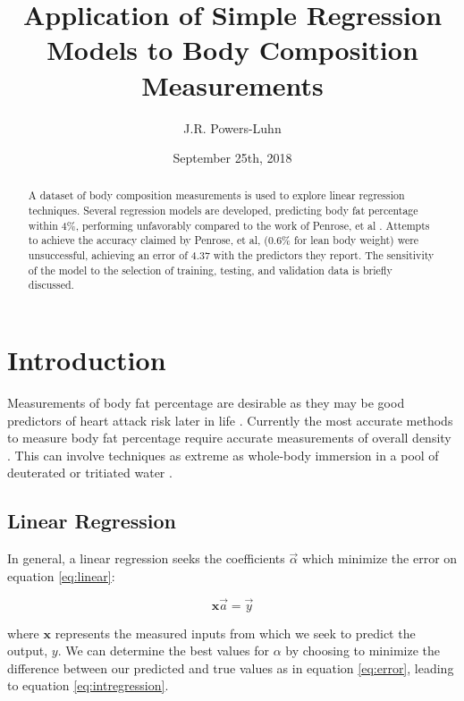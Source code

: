 \documentclass{IEEEtran}
\author{J.R. Powers-Luhn}
\title{Application of Simple Regression Models to Body Composition Measurements}
\date{September 25th, 2018}
\begin{document}
\maketitle

\begin{abstract}

A dataset of body composition measurements is used to explore linear regression techniques. Several regression models are developed, predicting body fat percentage within 4\%, performing unfavorably compared to the work of Penrose, et al \cite{Penrose1985}. Attempts to achieve the accuracy claimed by Penrose, et al, (0.6\% for lean body weight) were unsuccessful, achieving an error of 4.37 with the predictors they report. The sensitivity of the model to the selection of training, testing, and validation data is briefly discussed.

\end{abstract}

\section{Introduction}

Measurements of body fat percentage are desirable as they may be good predictors of heart attack risk later in life \cite{HealthyBodyFat2000}\cite{Rimm1995}. Currently the most accurate methods to measure body fat percentage require accurate measurements of overall density \cite{statsEducation}. This can involve techniques as extreme as whole-body immersion in a pool of deuterated or tritiated water \cite{HealthyBodyFat2000}.

\subsection{Linear Regression}

In general, a linear regression seeks the coefficients $\vec{\alpha}$ which minimize the error on equation \eqref{eq:linear}:

\begin{equation}
	\mathbf{x} \vec{a} = \vec{y}
	\label{eq:linear}
\end{equation}

where $\mathbf{x}$ represents the measured inputs from which we seek to predict the output, $y$. We can determine the best values for $\alpha$ by choosing to minimize the difference between our predicted and true values as in equation \eqref{eq:error}, leading to equation \eqref{eq:intregression}.
\end{document}
